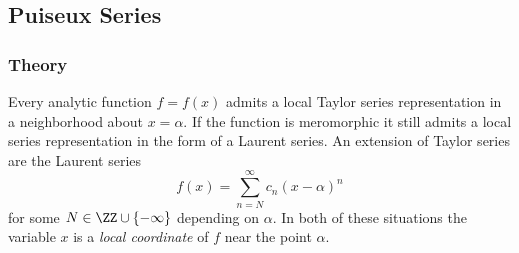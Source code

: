 \subsection{Puiseux Series}

\subsubsection*{Theory}

Every analytic function $f = f(x)$ admits a local Taylor series
representation in a neighborhood about $x = \alpha$. If the function is
meromorphic it still admits a local series representation in the form of
a Laurent series. An extension of Taylor series are the Laurent series
\[
    f(x) = \sum_{n=N}^\infty c_n (x-\alpha)^n
\]
for some $N \in \ZZ \cup \{-\infty\}$ depending on $\alpha$. In both of
these situations the variable $x$ is a {\it local coordinate} of $f$
near the point $\alpha$.


